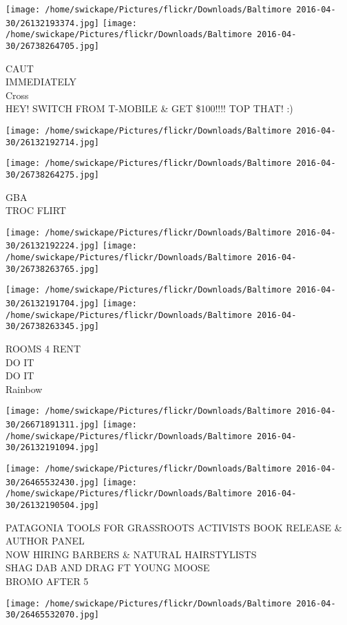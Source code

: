 \documentclass[10pt,letterpaper]{article}
\begin{document}
\texttt{[image: /home/swickape/Pictures/flickr/Downloads/Baltimore 2016-04-30/26132193374.jpg]}
\texttt{[image: /home/swickape/Pictures/flickr/Downloads/Baltimore 2016-04-30/26738264705.jpg]}

CAUT\\
IMMEDIATELY\\
Cross\\
HEY!  SWITCH FROM T{-}MOBILE \& GET \$100!!!! TOP THAT! :)
\pagebreak

\texttt{[image: /home/swickape/Pictures/flickr/Downloads/Baltimore 2016-04-30/26132192714.jpg]}

\vspace{0.25in}
\texttt{[image: /home/swickape/Pictures/flickr/Downloads/Baltimore 2016-04-30/26738264275.jpg]}

GBA\\
TROC FLIRT
\pagebreak

\texttt{[image: /home/swickape/Pictures/flickr/Downloads/Baltimore 2016-04-30/26132192224.jpg]}
\texttt{[image: /home/swickape/Pictures/flickr/Downloads/Baltimore 2016-04-30/26738263765.jpg]}

\texttt{[image: /home/swickape/Pictures/flickr/Downloads/Baltimore 2016-04-30/26132191704.jpg]}
\texttt{[image: /home/swickape/Pictures/flickr/Downloads/Baltimore 2016-04-30/26738263345.jpg]}

ROOMS 4 RENT\\
DO IT\\
DO IT\\
Rainbow
\pagebreak

\texttt{[image: /home/swickape/Pictures/flickr/Downloads/Baltimore 2016-04-30/26671891311.jpg]}
\texttt{[image: /home/swickape/Pictures/flickr/Downloads/Baltimore 2016-04-30/26132191094.jpg]}

\texttt{[image: /home/swickape/Pictures/flickr/Downloads/Baltimore 2016-04-30/26465532430.jpg]}
\texttt{[image: /home/swickape/Pictures/flickr/Downloads/Baltimore 2016-04-30/26132190504.jpg]}

PATAGONIA TOOLS FOR GRASSROOTS ACTIVISTS BOOK RELEASE \& AUTHOR PANEL\\
NOW HIRING BARBERS \& NATURAL HAIRSTYLISTS\\
SHAG DAB AND DRAG FT YOUNG MOOSE\\
BROMO AFTER 5
\pagebreak

\texttt{[image: /home/swickape/Pictures/flickr/Downloads/Baltimore 2016-04-30/26465532070.jpg]}
\end{document}
